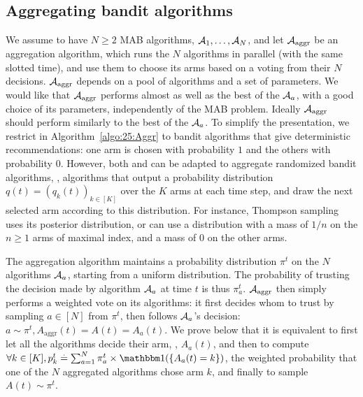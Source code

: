\subsection{Aggregating bandit algorithms}\label{sub:25:aggregation}
%
We assume to have $N \geq 2$ MAB algorithms, $\mathcal{A}_1, \dots, \mathcal{A}_N$,
and let $\mathcal{A}_{\mathrm{aggr}}$ be an aggregation algorithm,
which runs the $N$ algorithms in parallel (with the same slotted time), and use them to choose its arms based on a voting from their $N$ decisions.
%
$\mathcal{A}_{\mathrm{aggr}}$ depends on a pool of algorithms and a set of parameters.
We would like that $\mathcal{A}_{\mathrm{aggr}}$
performs almost as well as the best of the $\mathcal{A}_a$, with a good choice of its parameters, independently of the MAB problem.
Ideally $\mathcal{A}_{\mathrm{aggr}}$ should perform similarly to the best of the $\mathcal{A}_a$.
%
To simplify the presentation, we restrict in Algorithm~\ref{algo:25:Aggr} to bandit algorithms that give deterministic recommendations: one arm is chosen with probability $1$ and the others with probability $0$.
%
However, both \ExpQ{} and \Aggr{} can be adapted to aggregate randomized bandit algorithms, \ie, algorithms that output a probability distribution $q(t) = (q_k(t))_{k\in[K]}$ over the $K$ arms at each time step, and draw the next selected arm according to this distribution.
For instance, Thompson sampling uses its posterior distribution, or \UCB{} can use a distribution with a mass of $1/n$ on the $n \geq 1$ arms of maximal index, and a mass of $0$ on the other arms.

The aggregation algorithm maintains a probability distribution $\pi^{t}$ on the $N$ algorithms $\mathcal{A}_a$,
starting from a uniform distribution.
The probability of trusting the decision made by algorithm $\mathcal{A}_a$ at time $t$ is thus $\pi^t_a$.
$\mathcal{A}_{\mathrm{aggr}}$ then simply performs a weighted vote on its algorithms: it first decides whom to trust by sampling $a \in [N]$ from $\pi^t$, then follows $\mathcal{A}_a$'s decision: $a \sim \pi^t, A_{\mathrm{aggr}}(t) = A(t) = A_a(t)$.
We prove below that it is equivalent to first let all the algorithms decide their arm, \ie, $A_a(t)$, and then to compute
$\forall k\in[K], p^{t}_k \eqdef \sum_{a = 1}^{N} \pi^{t}_a \times \indic(\{A_a(t) = k\})$, the weighted probability that one of the $N$ aggregated algorithms chose arm $k$, and finally to sample $A(t)\sim\pi^t$.

